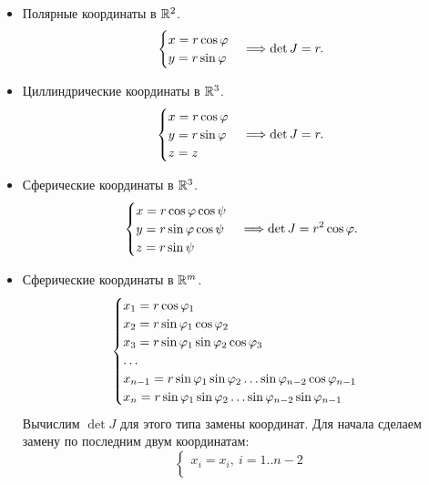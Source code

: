 \begin{example}
    \enewline
    \begin{itemize}
        \item Полярные координаты в $\mathbb{R}^2$.
            \[
                \begin{cases}
                    x = r \cos{\varphi} \\ 
                    y = r \sin{\varphi}
                \end{cases} \Longrightarrow \det{J} = r
            .\]
        \item Циллиндрические координаты в $\mathbb{R}^3$.
            \[
                \begin{cases}
                    x = r \cos{\varphi} \\
                    y = r \sin{\varphi} \\
                    z = z
                \end{cases} \Longrightarrow \det{J} = r
            .\]
        \item Сферические координаты в $\mathbb{R}^3$.
            \[
                \begin{cases}
                    x = r \cos{\varphi} \cos{\psi} \\
                    y = r \sin{\varphi} \cos{\psi} \\
                    z = r \sin{\psi}
                \end{cases} \Longrightarrow \det{J} = r^2 \cos{\varphi}
            .\]
        \item Сферические координаты в $\mathbb{R}^m$.
            \[
                \begin{cases}
                    x_1 = r \cos{\varphi_1} \\
                    x_2 = r \sin{\varphi_1} \cos{\varphi_2} \\
                    x_3 = r \sin{\varphi_1} \sin{\varphi_2} \cos{\varphi_3} \\
                    \ldots \\
                    x_{n - 1} = r \sin{\varphi_1} \sin{\varphi_2} \ldots \sin{\varphi_{n - 2}} \cos{\varphi_{n - 1}} \\
                    x_n = r \sin{\varphi_1} \sin{\varphi_2} \ldots \sin{\varphi_{n - 2}} \sin{\varphi_{n - 1}} 
                \end{cases}
            \]
            Вычислим $\det{J}$ для этого типа замены координат. Для начала сделаем замену
            по последним двум координатам:
            \[
                \begin{cases}
                    x_i = x_i,~ i = 1..{n-2} \\

\end{cases}\]
\end{itemize}
\end{example}
